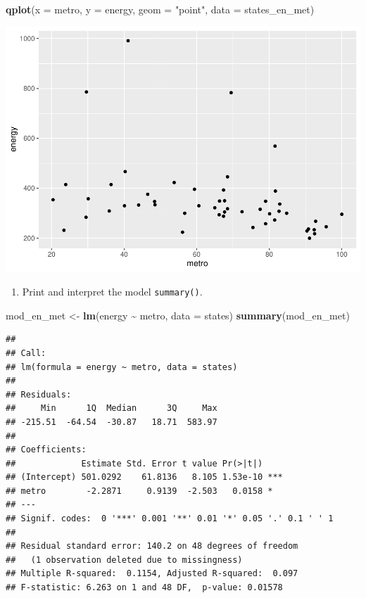 \documentclass[
]{book}
\newenvironment{Shaded}{\begin{snugshade}}{\end{snugshade}}
\newcommand{\DataTypeTok}[1]{\textcolor[rgb]{0.13,0.29,0.53}{#1}}
\newcommand{\KeywordTok}[1]{\textcolor[rgb]{0.13,0.29,0.53}{\textbf{#1}}}
\newcommand{\NormalTok}[1]{#1}
\newcommand{\OperatorTok}[1]{\textcolor[rgb]{0.81,0.36,0.00}{\textbf{#1}}}
\newcommand{\StringTok}[1]{\textcolor[rgb]{0.31,0.60,0.02}{#1}}
\providecommand{\tightlist}{%
  \setlength{\itemsep}{0pt}\setlength{\parskip}{0pt}}
\begin{document}
\begin{alert}
\begin{Shaded}
\begin{Highlighting}[]
  \KeywordTok{qplot}\NormalTok{(}\DataTypeTok{x =}\NormalTok{ metro, }\DataTypeTok{y =}\NormalTok{ energy, }\DataTypeTok{geom =} \StringTok{"point"}\NormalTok{, }\DataTypeTok{data =}\NormalTok{ states\_en\_met)}
\end{Highlighting}
\end{Shaded}

\includegraphics{R/Rmodels/figures/unnamed-chunk-108-1.pdf}

\begin{enumerate}
\def\labelenumi{\arabic{enumi}.}
\setcounter{enumi}{1}
\tightlist
\item
  Print and interpret the model \texttt{summary()}.
\end{enumerate}

\begin{Shaded}
\begin{Highlighting}[]
\NormalTok{  mod\_en\_met \textless{}{-}}\StringTok{ }\KeywordTok{lm}\NormalTok{(energy }\OperatorTok{\textasciitilde{}}\StringTok{ }\NormalTok{metro, }\DataTypeTok{data =}\NormalTok{ states)}
  \KeywordTok{summary}\NormalTok{(mod\_en\_met)}
\end{Highlighting}
\end{Shaded}

\begin{verbatim}
## 
## Call:
## lm(formula = energy ~ metro, data = states)
## 
## Residuals:
##     Min      1Q  Median      3Q     Max 
## -215.51  -64.54  -30.87   18.71  583.97 
## 
## Coefficients:
##             Estimate Std. Error t value Pr(>|t|)    
## (Intercept) 501.0292    61.8136   8.105 1.53e-10 ***
## metro        -2.2871     0.9139  -2.503   0.0158 *  
## ---
## Signif. codes:  0 '***' 0.001 '**' 0.01 '*' 0.05 '.' 0.1 ' ' 1
## 
## Residual standard error: 140.2 on 48 degrees of freedom
##   (1 observation deleted due to missingness)
## Multiple R-squared:  0.1154, Adjusted R-squared:  0.097 
## F-statistic: 6.263 on 1 and 48 DF,  p-value: 0.01578
\end{verbatim}


\end{alert}
\end{document}
